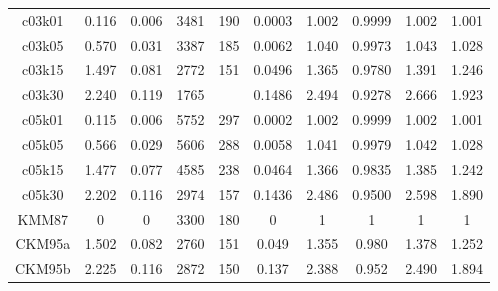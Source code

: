\begin{table}
\begin{tabular}{cccccccccc}
\toprule\toprule
c03k01  &  0.116   &  0.006   &  3481  &  190   &  0.0003  &  1.002   &  0.9999  &  1.002   &  1.001   \\
c03k05  &  0.570   &  0.031   &  3387  &  185   &  0.0062  &  1.040   &  0.9973  &  1.043   &  1.028   \\
\rowcolor{yellow}
c03k15  &  1.497   &  0.081   &  2772  &  151   &  0.0496  &  1.365   &  0.9780  &  1.391   &  1.246   \\
c03k30  &  2.240   &  0.119   &  1765  &  \z94  &  0.1486  &  2.494   &  0.9278  &  2.666   &  1.923   \\
\midrule
c05k01  &  0.115   &  0.006   &  5752  &  297   &  0.0002  &  1.002   &  0.9999  &  1.002   &  1.001   \\
c05k05  &  0.566   &  0.029   &  5606  &  288   &  0.0058  &  1.041   &  0.9979  &  1.042   &  1.028   \\
c05k15  &  1.477   &  0.077   &  4585  &  238   &  0.0464  &  1.366   &  0.9835  &  1.385   &  1.242   \\
c05k30  &  2.202   &  0.116   &  2974  &  157   &  0.1436  &  2.486   &  0.9500  &  2.598   &  1.890   \\
\midrule
KMM87   &  0\Z\z\z &  0\Z\z\z &  3300  &  180   &  0\Z\z\z &  1\Z\z\z &  1\Z\z\z &  1\Z\z\z &  1\Z\z\z \\
\rowcolor{yellow}
CKM95a  &  1.502   &  0.082   &  2760  &  151   &  0.049   &  1.355   &  0.980   &  1.378   &  1.252   \\
CKM95b  &  2.225   &  0.116   &  2872  &  150   &  0.137   &  2.388   &  0.952   &  2.490   &  1.894
\end{tabular}
\end{table}
